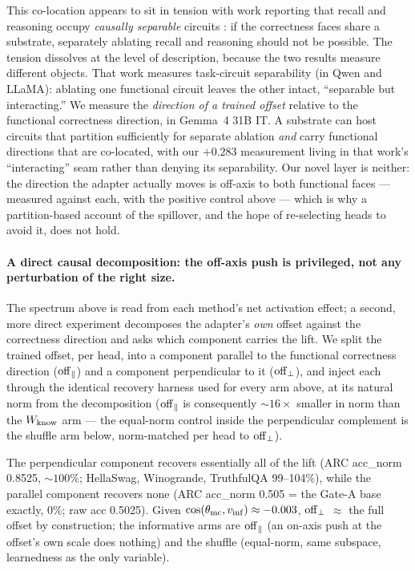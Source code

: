This co-location appears to sit in tension with work reporting that recall and
reasoning occupy \emph{causally separable} circuits
\citep{DisentanglingRecallReasoning}: if the correctness faces share a substrate,
separately ablating recall and reasoning should not be possible. The tension
dissolves at the level of description, because the two results measure different
objects. That work measures task-circuit separability (in Qwen and LLaMA): ablating
one functional circuit leaves the other intact, ``separable but interacting.'' We
measure the \emph{direction of a trained offset} relative to the functional
correctness direction, in Gemma~4 31B IT. A substrate can host circuits that
partition sufficiently for separate ablation \emph{and} carry functional directions
that are co-located, with our $+0.283$ measurement living in that work's
``interacting'' seam rather than denying its separability. Our novel layer is
neither: the direction the adapter actually moves is off-axis to both functional
faces --- measured against each, with the positive control above --- which is why a
partition-based account of the spillover, and the hope of re-selecting heads to
avoid it, does not hold.

\paragraph{A direct causal decomposition: the off-axis push is privileged, not any
perturbation of the right size.}
The spectrum above is read from each method's net activation effect; a second, more
direct experiment decomposes the adapter's \emph{own} offset against the
correctness direction and asks which component carries the lift. We split the
trained offset, per head, into a component parallel to the functional correctness
direction ($\mathrm{off}_{\parallel}$) and a component perpendicular to it ($\mathrm{off}_{\perp}$), and inject
each through the identical recovery harness used for every arm above, at its
natural norm from the decomposition ($\mathrm{off}_{\parallel}$ is consequently ${\sim}16\times$
smaller in norm than the $W_{\mathrm{know}}$ arm --- the equal-norm control inside the
perpendicular complement is the shuffle arm below, norm-matched per head to
$\mathrm{off}_{\perp}$).

The perpendicular component recovers essentially all of the lift (ARC acc\_norm
0.8525, ${\sim}100\%$; HellaSwag, Winogrande, TruthfulQA 99--104\%), while the
parallel component recovers none (ARC acc\_norm 0.505 = the Gate-A base exactly,
0\%; raw acc 0.5025). Given $\cos(\theta_{\mathrm{mc}}, v_{\mathrm{inf}}) \approx -0.003$, $\mathrm{off}_{\perp}$
${\approx}$ the full offset by construction; the informative arms are $\mathrm{off}_{\parallel}$ (an
on-axis push at the offset's own scale does nothing) and the shuffle (equal-norm,
same subspace, learnedness as the only variable).

